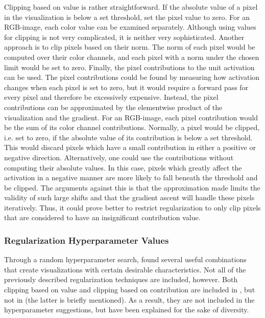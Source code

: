 \noindent Clipping based on value is rather straightforward. If the absolute value of a pixel in the visualization is below a set threshold, set the pixel value to zero. For an RGB-image, each color value can be examined separately. Although using values for clipping is not very complicated, it is neither very sophisticated. Another approach is to clip pixels based on their norm. The norm of each pixel would be computed over their color channels, and each pixel with a norm under the chosen limit would be set to zero. Finally, the pixel contributions to the unit activation can be used. The pixel contributions could be found by measuring how activation changes when each pixel is set to zero, but it would require a forward pass for every pixel and therefore be excessively expensive. Instead, the pixel contributions can be approximated by the elementwise product of the visualization and the gradient. For an RGB-image, each pixel contribution would be the sum of its color channel contributions. Normally, a pixel would be clipped, i.e. set to zero, if the absolute value of its contribution is below a set threshold. This would discard pixels which have a small contribution in either a positive or negative direction. Alternatively, one could use the contributions without computing their absolute values. In this case, pixels which greatly affect the activation in a negative manner are more likely to fall beneath the threshold and be clipped. The arguments against this is that the approximation made limits the validity of such large shifts and that the gradient ascent will handle these pixels iteratively. Thus, it could prove better to restrict regularization to only clip pixels that are considered to have an insignificant contribution value. 

\subsubsection{Regularization Hyperparameter Values}

Through a random hyperparameter search, \cite{deepvis} found several useful combinations that create visualizations with certain desirable characteristics. Not all of the previously described regularization techniques are included, however. Both clipping based on value and clipping based on contribution are included in \cite{deepvis_web}, but not in \cite{deepvis} (the latter is briefly mentioned). As a result, they are not included in the hyperparameter suggestions, but have been explained for the sake of diversity. \\

